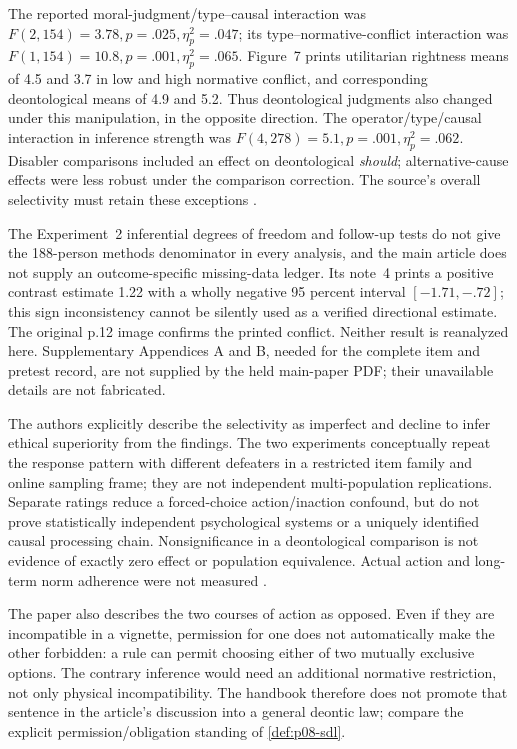 The reported moral-judgment/type--causal interaction was
\(F(2,154)=3.78,p=.025,\eta_p^2=.047\); its type--normative-conflict
interaction was \(F(1,154)=10.8,p=.001,\eta_p^2=.065\).
Figure~7 prints utilitarian rightness means of 4.5 and 3.7 in low and high
normative conflict, and corresponding deontological means of 4.9 and 5.2.
Thus deontological judgments also changed under this manipulation, in the
opposite direction. The operator/type/causal interaction in inference strength
was \(F(4,278)=5.1,p=.001,\eta_p^2=.062\). Disabler comparisons
included an effect on deontological \emph{should}; alternative-cause effects
were less robust under the comparison correction. The source's overall
selectivity must retain these exceptions
\cite[pp.~10--14, figs.~6--9]{ElqayamEtAl2017MoralInference}.

The Experiment~2 inferential degrees of freedom and follow-up tests do not
give the 188-person methods denominator in every analysis, and the main
article does not supply an outcome-specific missing-data ledger. Its note~4
prints a positive contrast estimate 1.22 with a wholly negative 95 percent
interval \([-1.71,-.72]\); this sign inconsistency cannot be silently used
as a verified directional estimate. The original p.12 image confirms the
printed conflict. Neither result is reanalyzed here. Supplementary Appendices
A and B, needed for the complete item and pretest record, are not supplied
by the held main-paper PDF; their unavailable details are not fabricated.

The authors explicitly describe the selectivity as imperfect and decline to
infer ethical superiority from the findings. The two experiments conceptually
repeat the response pattern with different defeaters in a restricted item
family and online sampling frame; they are not independent multi-population
replications. Separate ratings reduce a forced-choice action/inaction confound,
but do not prove statistically independent psychological systems or a uniquely
identified causal processing chain. Nonsignificance in a deontological
comparison is not evidence of exactly zero effect or population equivalence.
Actual action and long-term norm adherence were not measured
\cite[pp.~14--16]{ElqayamEtAl2017MoralInference}.

The paper also describes the two courses of action as opposed. Even if they
are incompatible in a vignette, permission for one does not automatically
make the other forbidden: a rule can permit choosing either of two mutually
exclusive options. The contrary inference would need an additional normative
restriction, not only physical incompatibility. The handbook therefore does
not promote that sentence in the article's discussion into a general deontic
law; compare the explicit permission/obligation standing of
\cref{def:p08-sdl}.

